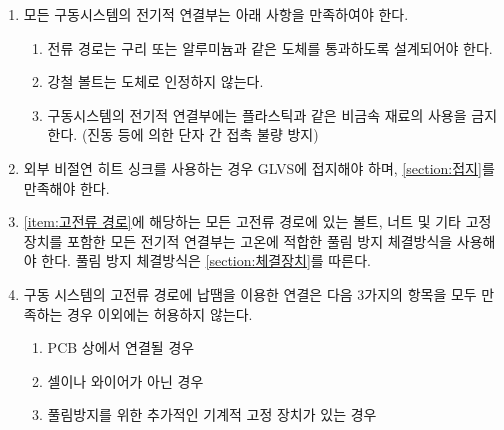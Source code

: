 \documentclass[final,a4paper,10pt]{report}
\begin{document}
\begin{enumerate}
  \item 모든 구동시스템의 전기적 연결부는 아래 사항을 만족하여야 한다.
    \begin{enumerate}
      \item 전류 경로는 구리 또는 알루미늄과 같은 도체를 통과하도록 설계되어야 한다.
      \item 강철 볼트는 도체로 인정하지 않는다.
      \item 구동시스템의 전기적 연결부에는 플라스틱과 같은 비금속 재료의 사용을 금지한다. (진동 등에 의한 단자 간 접촉 불량 방지)
    \end{enumerate}
    
  \item 외부 비절연 히트 싱크를 사용하는 경우 GLVS에 접지해야 하며, \cref{section:접지}를 만족해야 한다.
  \item \cref{item:고전류 경로}에 해당하는 모든 고전류 경로에 있는 볼트, 너트 및 기타 고정 장치를 포함한 모든 전기적 연결부는 고온에 적합한 풀림 방지 체결방식을 사용해야 한다. 풀림 방지 체결방식은 \cref{section:체결장치}를 따른다.
  
  \item 구동 시스템의 고전류 경로에 납땜을 이용한 연결은 다음 3가지의 항목을 모두 만족하는 경우 이외에는 허용하지 않는다.
    \begin{enumerate}
      \item PCB 상에서 연결될 경우
      \item 셀이나 와이어가 아닌 경우
      \item 풀림방지를 위한 추가적인 기계적 고정 장치가 있는 경우
    \end{enumerate}
\end{enumerate}
\end{document}

